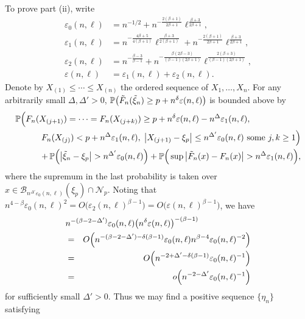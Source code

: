 \documentclass[a4paper, 12pt]{article}
\theoremstyle{plain}
\theoremstyle{definition}
\newcommand{\prob}{{\Bbb P}}
\begin{document}
To prove part (ii), write
\begin{align*}
\varepsilon_0(n,\ell)&=n^{-1/2}+n^{-\frac{2(\beta+1)}{2\beta+1}}
\ell^{\frac{\beta+3}{2\beta+1}}, \\
\varepsilon_1(n,\ell)&=n^{-\frac{4\beta+5}{4(\beta+1)}}
\ell^{\frac{\beta+3}{2(\beta+1)}}+n^{-\frac{2(\beta+1)}{2\beta+1}}
\ell^{\frac{\beta+3}{2\beta+1}},\\
\varepsilon_2(n,\ell)&=n^{-\frac{\beta-3}{\beta-1}}
+n^{-\frac{\beta(2\beta-3)}{(\beta-1)(2\beta+1)}}
\ell^{\frac{2(\beta+3)}{(\beta-1)(2\beta+1)}}, \\
\varepsilon(n,\ell)&=\varepsilon_1(n,\ell)+\varepsilon_2(n,\ell).
\end{align*}
Denote by $X_{(1)}\le\cdots\le X_{(n)}$ the ordered sequence of $X_1,\ldots,X_n$.
For any arbitrarily small $\Delta,\Delta'>0$, $\prob\big(\tilde{F}_n(\tilde\xi_n)\ge p+n^\delta\varepsilon(n,\ell)\big)$ is bounded above by
\begin{equation}
\begin{split}
\prob\Big(F_n(X_{(j+1)})=\cdots=F_n(X_{(j+k)})\ge p+n^\delta\varepsilon(n,\ell)
-n^\Delta\varepsilon_1(n,\ell),\qquad\qquad\qquad\\
F_n(X_{(j)})<p+n^\Delta\varepsilon_1(n,\ell),\;
\big|X_{(j+1)}-\xi_p\big|\le n^{\Delta'}\varepsilon_0(n,\ell)\text{\ some\ }
j,k\ge1 \Big)\\
+\,\prob\Big(\big|\tilde\xi_n-\xi_p\big|> n^{\Delta'}\varepsilon_0(n,\ell)\Big)+\prob\Big(\sup
\big|\tilde{F}_n(x)-F_n(x)\big|>n^\Delta\varepsilon_1(n,\ell)\Big),
\end{split}
\label{pf:quan2}
\end{equation}
where the supremum in the last probability is taken over
$x\in\mathscr{B}_{n^{\Delta'}\varepsilon_0(n,\ell)}(\xi_p)
\cap\mathscr{N}_p$.
Noting that $n^{4-\beta}\varepsilon_0(n,\ell)^2=O\big(\varepsilon_2(n,\ell)^{\beta-1}\big)=O\big(\varepsilon(n,\ell)^{\beta-1}\big)$,
we have
\begin{eqnarray*}
\lefteqn{n^{-(\beta-2-\Delta')}\varepsilon_0(n,\ell)
\big(n^\delta\varepsilon(n,\ell)\big)^{-
(\beta-1)}} \\
&=&O\Big(n^{-(\beta-2-\Delta')-\delta(\beta-1)}\varepsilon_0(n,\ell)
n^{\beta-4}\varepsilon_0(n,\ell)^{-2}\Big)\\
&=&O\Big(n^{-2+\Delta'-\delta(\beta-1)}\varepsilon_0(n,\ell)^{-1}
\Big)\\
&=&o\Big(
n^{-2-\Delta'}\varepsilon_0(n,\ell)^{-1}\Big)
\end{eqnarray*}
for sufficiently small $\Delta'>0$. Thus we may find a positive sequence $\{\eta_n\}$ satisfying
\end{document}
